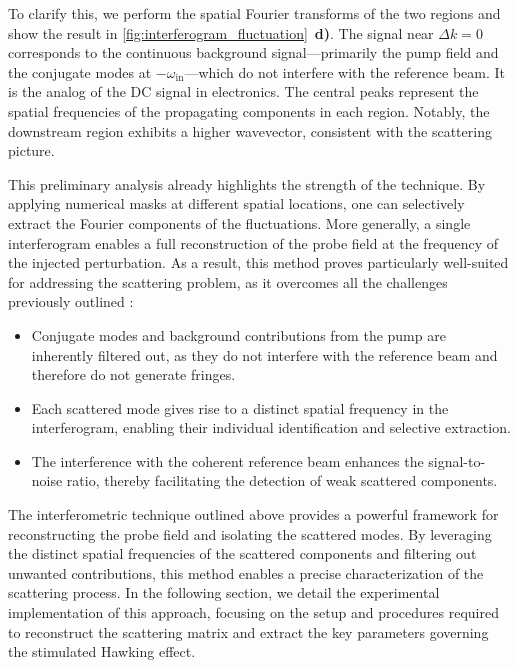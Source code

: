 To clarify this, we perform the spatial Fourier transforms of the two regions and show the result in \autoref{fig:interferogram_fluctuation}~\textbf{d)}. The signal near \(\Delta k=0\) corresponds to the continuous background signal—primarily the pump field and the conjugate modes at \(-\omega_{\text{in}}\)—which do not interfere with the reference beam. It is the analog of the DC signal in electronics. The central peaks represent the spatial frequencies of the propagating components in each region. Notably, the downstream region exhibits a higher wavevector, consistent with the scattering picture.

This preliminary analysis already highlights the strength of the technique. By applying numerical masks at different spatial locations, one can selectively extract the Fourier components of the fluctuations. More generally, a single interferogram enables a full reconstruction of the probe field at the frequency of the injected perturbation. As a result, this method proves particularly well-suited for addressing the scattering problem, as it overcomes all the challenges previously outlined :



\begin{itemize}
    \item Conjugate modes and background contributions from the pump are inherently filtered out, as they do not interfere with the reference beam and therefore do not generate fringes.
    \item Each scattered mode gives rise to a distinct spatial frequency in the interferogram, enabling their individual identification and selective extraction.
    \item The interference with the coherent reference beam enhances the signal-to-noise ratio, thereby facilitating the detection of weak scattered components.
\end{itemize}


The interferometric technique outlined above provides a powerful framework for reconstructing the probe field and isolating the scattered modes.
 By leveraging the distinct spatial frequencies of the scattered components and filtering out unwanted contributions, this method enables a precise characterization of the scattering process. In the following section, we detail the experimental implementation of this approach, focusing on the setup and procedures required to reconstruct the scattering matrix and extract the key parameters governing the stimulated Hawking effect.

